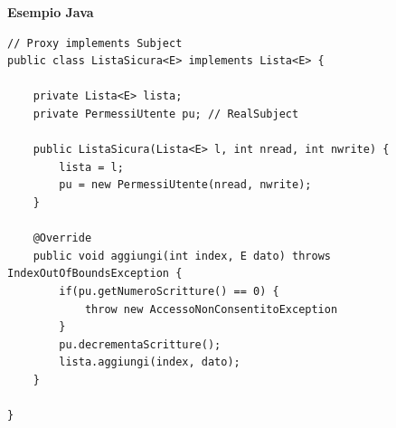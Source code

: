 \textbf{Esempio Java}
\begin{verbatim}
// Proxy implements Subject
public class ListaSicura<E> implements Lista<E> {

    private Lista<E> lista;
    private PermessiUtente pu; // RealSubject

    public ListaSicura(Lista<E> l, int nread, int nwrite) {
        lista = l;
        pu = new PermessiUtente(nread, nwrite);
    }

    @Override
    public void aggiungi(int index, E dato) throws IndexOutOfBoundsException {
        if(pu.getNumeroScritture() == 0) {
            throw new AccessoNonConsentitoException
        }
        pu.decrementaScritture();
        lista.aggiungi(index, dato);
    }

}
\end{verbatim}


\newpage